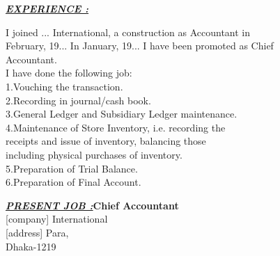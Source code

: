 \documentclass[12pt, a4paper]{article}
\begin{document}
\fontsize{12pt}{17pt}\selectfont
\raggedright
\frenchspacing

\textbf{\textit{\underline{EXPERIENCE :}}}

\vspace{14pt}
\hspace*{0.4in}I joined ... International, a construction as Accountant in\\
February, 19... In January, 19... I have been promoted as Chief\\
Accountant.\\
\hspace*{0.4in}I have done the following job:\\
\hspace*{0.5in}1.\hspace*{0.1in}Vouching the transaction.\\
\hspace*{0.5in}2.\hspace*{0.1in}Recording in journal/cash book.\\
\hspace*{0.5in}3.\hspace*{0.1in}General Ledger and Subsidiary Ledger maintenance.\\
\hspace*{0.5in}4.\hspace*{0.1in}Maintenance of Store Inventory, i.e. recording the\\
\hspace*{0.8in}receipts and issue of inventory, balancing those\\
\hspace*{0.8in}including physical purchases of inventory.\\
\hspace*{0.5in}5.\hspace*{0.1in}Preparation of Trial Balance.\\
\hspace*{0.5in}6.\hspace*{0.1in}Preparation of Final Account.

\vspace{34pt}
\textbf{\textit{\underline{PRESENT JOB :}}}\hspace*{0.62in}\textbf{Chief Accountant}\\
\hspace*{1.92in}[company] International\\
\hspace*{1.92in}[address] Para,\\
\hspace*{1.92in}Dhaka-1219
\end{document}
